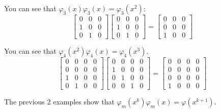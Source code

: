 \begin{example}{}
	You can see that $\varphi_3(x)\varphi_3(x) = \varphi_3(x^2)$:
	\[
\left[\begin{array}{ccc}0 & 0 & 0 \\1 & 0 & 0 \\0 & 1 & 0 \end{array}\right] \left[\begin{array}{ccc}0 & 0 & 0 \\1 & 0 & 0 \\0 & 1 & 0 \end{array}\right]
	=\left[\begin{array}{ccc}0 & 0 & 0 \\0 & 0 & 0 \\1 & 0 & 0 \end{array}\right] 
\]
\end{example}

\begin{example}{}
	You can see that $\varphi_4(x^2)\varphi_4(x) = \varphi_4(x^3)$.
	\[\left[\begin{array}{cccc}0 & 0 & 0 & 0 \\0 & 0 & 0 & 0 \\1 & 0 & 0 & 0\\ 0 & 1 & 0 & 0 \end{array}\right] \left[\begin{array}{cccc}0 & 0 & 0 & 0 \\1 & 0 & 0 & 0 \\0 & 1 & 0 & 0\\0 & 0 & 1 & 0 \end{array}\right]
	= \left[\begin{array}{cccc}0 & 0 & 0 & 0 \\0 & 0 & 0 & 0 \\0 & 0 & 0 & 0\\1 & 0 & 0 & 0 \end{array}\right]
	\]
\end{example}
The previous 2 examples show that $\varphi_m(x^k) \varphi_m(x) = \varphi(x^{k+1})$.

